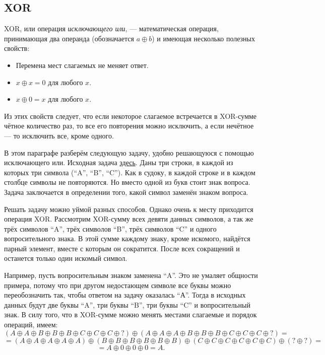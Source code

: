 \subsection{XOR}

    XOR, или операция \emph{исключающего или}, --- математическая операция, принимающая два операнда (обозначается \(a \oplus b\)) и имеющая несколько полезных свойств:
    \begin{itemize}
        \item Перемена мест слагаемых не меняет ответ.
        \item \(x \oplus x = 0\) для любого $x$.
        \item \(x \oplus 0 = x\) для любого $x$.
    \end{itemize}
    Из этих свойств следует, что если некоторое слагаемое встречается в XOR-сумме чётное количество раз, то все его повторения можно исключить, а если нечётное --- то исключить все, кроме одного.

    В этом параграфе разберём следующую задачу, удобно решающуюся с помощью исключающего или. Исходная задача \href{https://codeforces.com/contest/1915/problem/B}{здесь}. Даны три строки, в каждой из которых три символа (``A'', ``B'', ``C''). Как в судоку, в каждой строке и в каждом столбце символы не повторяются. Но вместо одной из букв стоит знак вопроса. Задача заключается в определении того, какой символ заменён знаком вопроса.

    Решать задачу можно уймой разных способов. Однако очень к месту приходится операция XOR. Рассмотрим XOR-сумму всех девяти данных символов, а так же трёх символов ``A'', трёх символов ``B'', трёх символов ``C'' и одного вопросительного знака. В этой сумме каждому знаку, кроме искомого, найдётся парный элемент, вместе с которым он сократится. После всех сокращений и останется только один искомый символ.
    
    Например, пусть вопросительным знаком заменена ``A''. Это не умаляет общности примера, потому что при другом недостающем символе все буквы можно переобозначить так, чтобы ответом на задачу оказалась ``А''. Тогда в исходных данных будут две буквы ``A'', три буквы ``B'', три буквы ``C'' и вопросительный знак. В силу того, что в XOR-сумме можно менять местами слагаемые и порядок операций, имеем:
    \[(A \oplus A \oplus B \oplus B \oplus B \oplus C \oplus C \oplus C \oplus ?) \oplus (A \oplus A \oplus A \oplus B \oplus B \oplus B \oplus C \oplus C \oplus C \oplus ?)=\]\[=(A \oplus A \oplus A \oplus A \oplus A) \oplus (B \oplus B \oplus B \oplus B \oplus B \oplus B) \oplus (C \oplus C \oplus C \oplus C \oplus C \oplus C) \oplus (? \oplus ?)=\]\[=A \oplus 0 \oplus 0 \oplus 0 = A.\]

